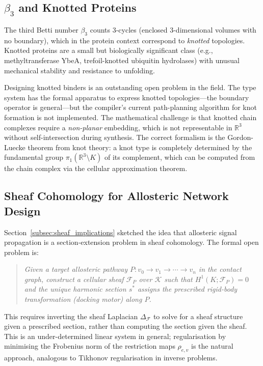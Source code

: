 \subsection{$\beta_3$ and Knotted Proteins}
\label{subsec:beta3_knotted}

The third Betti number $\beta_3$ counts 3-cycles (enclosed 3-dimensional
volumes with no boundary), which in the protein context correspond to
\emph{knotted} topologies.  Knotted proteins are a small but biologically
significant class (e.g., methyltransferase YbeA, trefoil-knotted ubiquitin
hydrolases) with unusual mechanical stability and resistance to unfolding.

Designing knotted binders is an outstanding open problem in the field.
The \ToposLang{} type system has the formal apparatus to express knotted
topologies---the boundary operator is general---but the compiler's current
path-planning algorithm for knot formation is not implemented.  The
mathematical challenge is that knotted chain complexes require a
\emph{non-planar} embedding, which is not representable in $\mathbb{R}^3$
without self-intersection during synthesis.  The correct formalism is the
Gordon-Luecke theorem from knot theory: a knot type is completely determined
by the fundamental group $\pi_1(\mathbb{R}^3 \setminus K)$ of its complement,
which can be computed from the chain complex via the cellular approximation
theorem.

\subsection{Sheaf Cohomology for Allosteric Network Design}
\label{subsec:sheaf_allosteric}

Section~\ref{subsec:sheaf_implications} sketched the idea that allosteric
signal propagation is a section-extension problem in sheaf cohomology.  The
formal open problem is:

\begin{quote}
\emph{Given a target allosteric pathway $P: v_0 \to v_1 \to \cdots \to v_n$
in the contact graph, construct a cellular sheaf $\mathcal{F}_P$ over
$\mathcal{K}$ such that $H^1(K; \mathcal{F}_P) = 0$ and the unique harmonic
section $s^*$ assigns the prescribed rigid-body transformation (docking motor)
along $P$.}
\end{quote}

This requires inverting the sheaf Laplacian $\Delta_{\mathcal{F}}$ to solve
for a sheaf structure given a prescribed section, rather than computing the
section given the sheaf.  This is an under-determined linear system in general;
regularisation by minimising the Frobenius norm of the restriction maps
$\rho_{e,v}$ is the natural approach, analogous to Tikhonov regularisation in
inverse problems.

